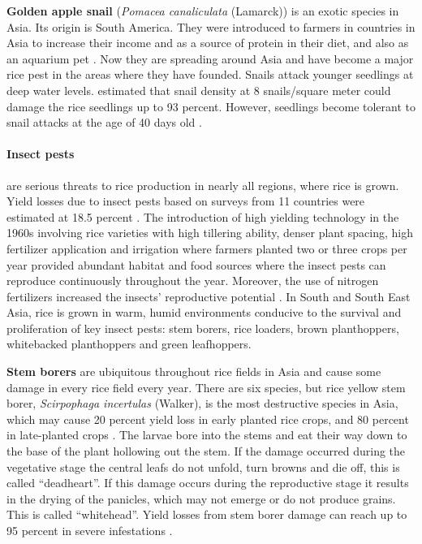 \textbf{Golden apple snail} (\textit{Pomacea canaliculata} (Lamarck)) is an exotic species in Asia. Its origin is South America. They were introduced to farmers in countries in Asia to increase their income and as a source of protein in their diet, and also as an aquarium pet \citep{Joshi_2007_Problems}.  Now they are spreading around Asia and have become a major rice pest in the areas where they have founded. Snails attack younger seedlings at deep water levels. \citep{Basilio_1991_Problems} estimated that snail density at 8 snails/square meter could damage the rice seedlings up to 93 percent. However, seedlings become tolerant to snail attacks at the age of 40 days old \citep{Sin_2003_Damage}.  

\paragraph{Insect pests} are serious threats to rice production in nearly all regions, where rice is grown. Yield losses due to insect pests based on surveys from 11 countries were estimated at 18.5 percent \citep{Pathak_1994_Insect}.  The introduction of high yielding technology in the 1960s involving rice varieties with high tillering ability, denser plant spacing, high fertilizer application and irrigation where farmers planted two or three crops per year provided abundant habitat and food sources where the insect pests can reproduce continuously throughout the year. Moreover, the use of nitrogen fertilizers increased the insects' reproductive potential \citep{Bottrell_2012_Resurrecting}. In South and South East Asia, rice is grown in warm, humid environments conducive to the survival and proliferation of key insect pests: stem borers, rice loaders, brown planthoppers, whitebacked planthoppers and green leafhoppers.

\textbf{Stem borers} are ubiquitous throughout rice fields in Asia and cause some damage in every rice field every year. There are six species, but rice yellow stem borer, \textit{Scirpophaga incertulas} (Walker), is the most destructive species in Asia, which may cause 20 percent yield loss in early planted rice crops, and 80 percent in late-planted crops \cite{Ooi_1994_Predators}. The larvae bore into the stems and eat their way down to the base of the plant hollowing out the stem. If the damage occurred during the vegetative stage the central leafs do not unfold, turn browns and die off, this is called ``deadheart''. If this damage occurs during the reproductive stage it results in the drying of the panicles, which may not emerge or do not produce grains. This is called ``whitehead''. Yield losses from stem borer damage can reach up to 95 percent in severe infestations \cite{Pathak_1994_Insect}.


